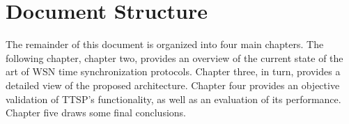 \section{Document Structure}
The remainder of this document is organized into four main chapters. The following chapter, chapter two, provides an overview of the current state of the art of WSN time synchronization protocols. Chapter three, in turn, provides a detailed view of the proposed architecture. Chapter four provides an objective validation of TTSP's functionality, as well as an evaluation of its performance. Chapter five draws some final conclusions.